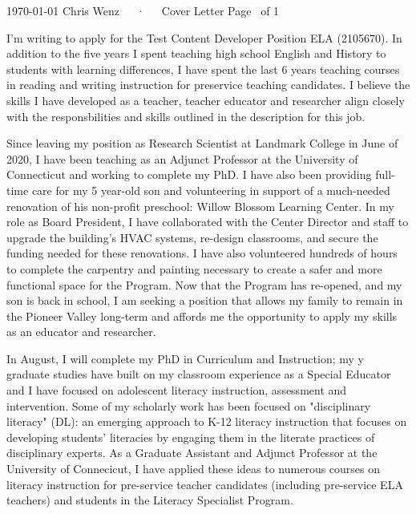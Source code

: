 \documentclass[11pt, a4paper]{awesome-cv}
\begin{document}
\makecvheader[C]

\makecvfooter
  {\today}
  {Chris Wenz~~~·~~~Cover Letter}
  {Page \thepage\ of 1}

\begin{cvletter}

I'm writing to apply for the Test Content Developer Position ELA (2105670). In addition to the five years I spent teaching high school English and History to students with learning differences, I have spent the last 6 years teaching courses in reading and writing instruction for preservice teaching candidates. I believe the skills I have developed as a teacher, teacher educator and researcher align closely with the responsbilities and skills outlined in the description for this job. 

Since leaving my position as Research Scientist at Landmark College in June of 2020, I have been teaching as an Adjunct Professor at the University of Connecticut and working to complete my PhD. I have also been providing full-time care for my 5 year-old son and volunteering in support of a much-needed renovation of his non-profit preschool: Willow Blossom Learning Center. In my role as Board President, I have collaborated with the Center Director and staff to upgrade the building's HVAC systems, re-design classrooms, and secure the funding needed for these renovations. I have also volunteered hundreds of hours to complete the carpentry and painting necessary to create a safer and more functional space for the Program. Now that the Program has re-opened, and my son is back in school, I am seeking a position that allows my family to remain in the Pioneer Valley long-term and affords me the opportunity to apply my skills as an educator and researcher. 

In August, I will complete my PhD in Curriculum and Instruction; my y graduate studies have built on my classroom experience as a Special Educator and I have focused on adolescent literacy instruction, assessment and intervention. Some of my scholarly work has been focused on "disciplinary literacy" (DL): an emerging approach to K-12 literacy instruction that focuses on developing students' literacies by engaging them in the literate practices of disciplinary experts. As a Graduate Assistant and Adjunct Professor at the University of Connecicut, I have applied these ideas to numerous courses on literacy instruction for pre-service teacher candidates (including pre-service ELA teachers) and students in the Literacy Specialist Program.


\end{cvletter}
\end{document}
